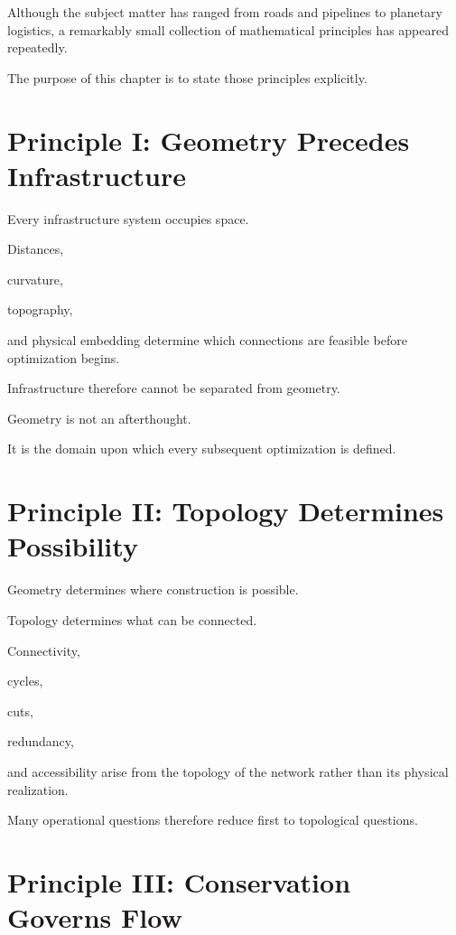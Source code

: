 \documentclass[11pt,fleqn]{book}
\numberwithin{equation}{chapter}
\theoremstyle{plain}
\theoremstyle{definition}
\theoremstyle{remark}
\begin{document}
Although the subject matter has ranged from roads and pipelines to
planetary logistics, a remarkably small collection of mathematical
principles has appeared repeatedly.

The purpose of this chapter is to state those principles explicitly.


\section{Principle I: Geometry Precedes Infrastructure}

Every infrastructure system occupies space.

Distances,

curvature,

topography,

and physical embedding determine which connections are feasible before
optimization begins.

Infrastructure therefore cannot be separated from geometry.

Geometry is not an afterthought.

It is the domain upon which every subsequent optimization is defined.


\section{Principle II: Topology Determines Possibility}

Geometry determines where construction is possible.

Topology determines what can be connected.

Connectivity,

cycles,

cuts,

redundancy,

and accessibility arise from the topology of the network rather than
its physical realization.

Many operational questions therefore reduce first to topological
questions.


\section{Principle III: Conservation Governs Flow}
\end{document}
